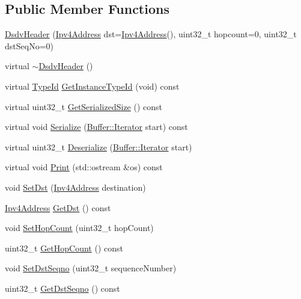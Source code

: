 \subsection*{Public Member Functions}
\begin{DoxyCompactItemize}
\item 
\hyperlink{classns3_1_1dsdv_1_1DsdvHeader_a1d07b59872486011c468f297abaab250}{Dsdv\+Header} (\hyperlink{classns3_1_1Ipv4Address}{Ipv4\+Address} dst=\hyperlink{classns3_1_1Ipv4Address}{Ipv4\+Address}(), uint32\+\_\+t hopcount=0, uint32\+\_\+t dst\+Seq\+No=0)
\item 
virtual \hyperlink{classns3_1_1dsdv_1_1DsdvHeader_a10bda4f419df32861526b6e053218c5d}{$\sim$\+Dsdv\+Header} ()
\item 
virtual \hyperlink{classns3_1_1TypeId}{Type\+Id} \hyperlink{classns3_1_1dsdv_1_1DsdvHeader_a852183e94085229996f0fcddb71e83fd}{Get\+Instance\+Type\+Id} (void) const 
\item 
virtual uint32\+\_\+t \hyperlink{classns3_1_1dsdv_1_1DsdvHeader_a04d8416a137a372ba7c162e68e8aa497}{Get\+Serialized\+Size} () const 
\item 
virtual void \hyperlink{classns3_1_1dsdv_1_1DsdvHeader_ac66ca0a7c40c750113e8e97f81bead2c}{Serialize} (\hyperlink{classns3_1_1Buffer_1_1Iterator}{Buffer\+::\+Iterator} start) const 
\item 
virtual uint32\+\_\+t \hyperlink{classns3_1_1dsdv_1_1DsdvHeader_a63c2b107d15967539e0e2b9f129efbbb}{Deserialize} (\hyperlink{classns3_1_1Buffer_1_1Iterator}{Buffer\+::\+Iterator} start)
\item 
virtual void \hyperlink{classns3_1_1dsdv_1_1DsdvHeader_ad310421b0f6aca47d1f14d13c780f606}{Print} (std\+::ostream \&os) const 
\item 
void \hyperlink{classns3_1_1dsdv_1_1DsdvHeader_a9b3daa1198d56f18b726e588172ed15f}{Set\+Dst} (\hyperlink{classns3_1_1Ipv4Address}{Ipv4\+Address} destination)
\item 
\hyperlink{classns3_1_1Ipv4Address}{Ipv4\+Address} \hyperlink{classns3_1_1dsdv_1_1DsdvHeader_a0ba8cf6810af97ac09fdacb8843d338e}{Get\+Dst} () const 
\item 
void \hyperlink{classns3_1_1dsdv_1_1DsdvHeader_ada53aa7a633210373629dfba2a484456}{Set\+Hop\+Count} (uint32\+\_\+t hop\+Count)
\item 
uint32\+\_\+t \hyperlink{classns3_1_1dsdv_1_1DsdvHeader_a11f71dab9077edb26e02659b3a4d9a71}{Get\+Hop\+Count} () const 
\item 
void \hyperlink{classns3_1_1dsdv_1_1DsdvHeader_a4ecf1fa5470fffe81c0195f9b9035b65}{Set\+Dst\+Seqno} (uint32\+\_\+t sequence\+Number)
\item 
uint32\+\_\+t \hyperlink{classns3_1_1dsdv_1_1DsdvHeader_a0c31097c5f1900c0f65e32f8a1821d10}{Get\+Dst\+Seqno} () const 
\end{DoxyCompactItemize}

